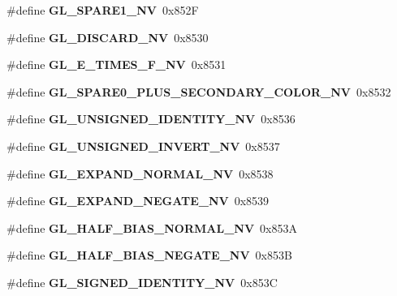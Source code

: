 \begin{DoxyCompactItemize}
\item 
\#define {\bfseries G\+L\+\_\+\+S\+P\+A\+R\+E1\+\_\+\+N\+V}~0x852\+F\label{_s_d_l__opengl_8h_a6ec220f12ae58fa5c64e92dd9d1a48bd}

\item 
\#define {\bfseries G\+L\+\_\+\+D\+I\+S\+C\+A\+R\+D\+\_\+\+N\+V}~0x8530\label{_s_d_l__opengl_8h_ae68786cfd2f64aab537e4224bea9d9f9}

\item 
\#define {\bfseries G\+L\+\_\+\+E\+\_\+\+T\+I\+M\+E\+S\+\_\+\+F\+\_\+\+N\+V}~0x8531\label{_s_d_l__opengl_8h_adb43bdfd4107d85aaf91932e56f050bf}

\item 
\#define {\bfseries G\+L\+\_\+\+S\+P\+A\+R\+E0\+\_\+\+P\+L\+U\+S\+\_\+\+S\+E\+C\+O\+N\+D\+A\+R\+Y\+\_\+\+C\+O\+L\+O\+R\+\_\+\+N\+V}~0x8532\label{_s_d_l__opengl_8h_ac039c3e9f3bd330d587b25b7ec972458}

\item 
\#define {\bfseries G\+L\+\_\+\+U\+N\+S\+I\+G\+N\+E\+D\+\_\+\+I\+D\+E\+N\+T\+I\+T\+Y\+\_\+\+N\+V}~0x8536\label{_s_d_l__opengl_8h_a817936bba382e9bec560664aa31e5e76}

\item 
\#define {\bfseries G\+L\+\_\+\+U\+N\+S\+I\+G\+N\+E\+D\+\_\+\+I\+N\+V\+E\+R\+T\+\_\+\+N\+V}~0x8537\label{_s_d_l__opengl_8h_aa2d0a1cc18cd57807a313a82e120c632}

\item 
\#define {\bfseries G\+L\+\_\+\+E\+X\+P\+A\+N\+D\+\_\+\+N\+O\+R\+M\+A\+L\+\_\+\+N\+V}~0x8538\label{_s_d_l__opengl_8h_a97359e41199839e011642c84db08af72}

\item 
\#define {\bfseries G\+L\+\_\+\+E\+X\+P\+A\+N\+D\+\_\+\+N\+E\+G\+A\+T\+E\+\_\+\+N\+V}~0x8539\label{_s_d_l__opengl_8h_af4642911ed4604ed59c3241ce88fce8e}

\item 
\#define {\bfseries G\+L\+\_\+\+H\+A\+L\+F\+\_\+\+B\+I\+A\+S\+\_\+\+N\+O\+R\+M\+A\+L\+\_\+\+N\+V}~0x853\+A\label{_s_d_l__opengl_8h_add334c3322f5879938b61ef2c5ffe707}

\item 
\#define {\bfseries G\+L\+\_\+\+H\+A\+L\+F\+\_\+\+B\+I\+A\+S\+\_\+\+N\+E\+G\+A\+T\+E\+\_\+\+N\+V}~0x853\+B\label{_s_d_l__opengl_8h_a4da18e7beca683d530f52f4d6b5c502c}

\item 
\#define {\bfseries G\+L\+\_\+\+S\+I\+G\+N\+E\+D\+\_\+\+I\+D\+E\+N\+T\+I\+T\+Y\+\_\+\+N\+V}~0x853\+C\label{_s_d_l__opengl_8h_a8f29ce5c18cf8bce1cb77ea8057a7e3e}


\end{DoxyCompactItemize}
